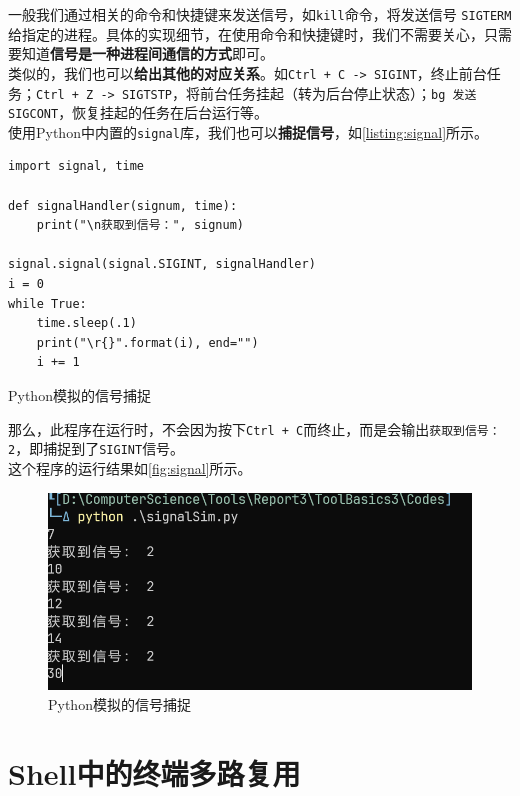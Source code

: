 一般我们通过相关的命令和快捷键来发送信号，如\texttt{kill}命令，将发送信号 \texttt{SIGTERM} 给指定的进程。具体的实现细节，在使用命令和快捷键时，我们不需要关心，只需要知道\textbf{信号是一种进程间通信的方式}即可。\\

类似的，我们也可以\textbf{给出其他的对应关系}。如\texttt{Ctrl + C -> SIGINT}，终止前台任务；\texttt{Ctrl + Z -> SIGTSTP}，将前台任务挂起（转为后台停止状态）；\texttt{bg 发送 SIGCONT}，恢复挂起的任务在后台运行等。\\

使用Python中内置的\texttt{signal}库，我们也可以\textbf{捕捉信号}，如\autoref{listing:signal}所示。

\begin{longlisting}
    \begin{verbatim}
import signal, time

def signalHandler(signum, time):
    print("\n获取到信号：", signum)

signal.signal(signal.SIGINT, signalHandler)
i = 0
while True:
    time.sleep(.1)
    print("\r{}".format(i), end="")
    i += 1
    \end{verbatim}
    \caption{Python模拟的信号捕捉}
    \label{listing:signal}
\end{longlisting}

那么，此程序在运行时，不会因为按下\texttt{Ctrl + C}而终止，而是会输出\texttt{获取到信号： 2}，即捕捉到了\texttt{SIGINT}信号。\\

这个程序的运行结果如\autoref{fig:signal}所示。

\begin{figure}[!h]
    \centering
    \includegraphics[width=.8\textwidth]{./Figures/signal.png}
    \caption{Python模拟的信号捕捉}
    \label{fig:signal}
\end{figure}

\section{Shell中的终端多路复用}

